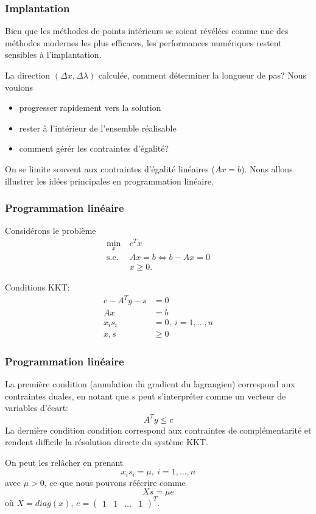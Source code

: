 \documentclass[usepdftitle=false]{beamer}
\begin{document}
\begin{frame}
\frametitle{Implantation}

Bien que les méthodes de points intérieurs se soient révélées comme une des méthodes modernes les plus efficaces, les performances numériques restent sensibles à l'implantation.

\mbox{}

La direction $(\Delta x, \Delta \lambda)$ calculée, comment déterminer la longueur de pas? Nous voulons
\begin{itemize}
	\item progresser rapidement vers la solution
	\item rester à l'intérieur de l'ensemble réalisable
	\item comment gérér les contraintes d'égalité?
\end{itemize}

\mbox{}

On se limite souvent aux contraintes d'égalité linéaires ($Ax = b$).
Nous allons illustrer les idées principales en programmation linéaire.

\end{frame}

\begin{frame}
\frametitle{Programmation linéaire}

Considérons le problème
\begin{align*}
\min_x\ & c^Tx \\
\mbox{s.c. } & Ax = b \Leftrightarrow b-Ax = 0\\
& x \geq 0.
\end{align*}

\mbox{}

Conditions KKT:
\begin{align*}
c-A^Ty-s &= 0 \\
Ax &= b \\
x_is_i &= 0, \ i =1,\ldots,n \\
x, s &\geq 0
\end{align*}

\end{frame}

\begin{frame}
\frametitle{Programmation linéaire}

La première condition (annulation du gradient du lagrangien) correspond aux contraintes duales, en notant que $s$ peut s'interpréter comme un vecteur de variables d'écart:
$$
A^Ty \leq c
$$
La dernière condition condition correspond aux contraintes de complémentarité et rendent difficile la résolution directe du système KKT.

\mbox{}

On peut les relâcher en prenant
$$
x_is_i = \mu, \ i =1,\ldots,n
$$
avec $\mu > 0$, ce que nous pouvons réécrire comme
$$
Xs = \mu e
$$
où $X = diag(x)$, $e = \begin{pmatrix} 1 & 1 & \ldots & 1 \end{pmatrix}^T$.

\end{frame}
\end{document}
